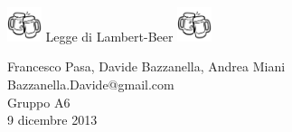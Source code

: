 \begin{center}
        \includegraphics[width=10mm]{beer.pdf}
     	{\huge \; Legge di Lambert-Beer \;}
     	\includegraphics[width=10mm]{beer.pdf}
    \vspace{0.5cm}

      	{\large Francesco Pasa, Davide Bazzanella, Andrea Miani} \\
      	{Bazzanella.Davide@gmail.com} \\
		{\large Gruppo A6} \\
	
	\vspace{0.2cm}
      	{\large 9 dicembre 2013}

\end{center}
